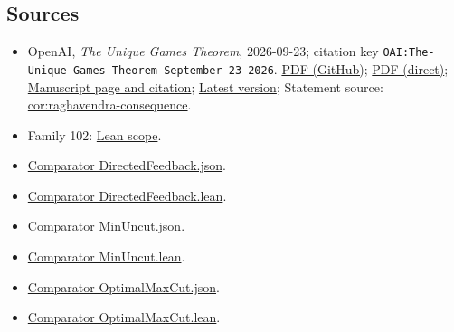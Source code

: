 \documentclass[11pt]{article}
\begin{document}
\subsection{Sources}
\begin{itemize}
\item OpenAI, \emph{The Unique Games Theorem}, 2026-09-23; citation key \texttt{OAI:The-Unique-Games-Theorem-September-23-2026}. \href{https://github.com/openai/math/blob/adc7f1241b42e322a6451854ab7e4b4c146bf78a/preprints/The-Unique-Games-Theorem-September-23-2026/paper.pdf}{PDF (GitHub)}; \href{https://github.com/openai/math/raw/adc7f1241b42e322a6451854ab7e4b4c146bf78a/preprints/The-Unique-Games-Theorem-September-23-2026/paper.pdf}{PDF (direct)}; \href{https://github.com/openai/math/blob/adc7f1241b42e322a6451854ab7e4b4c146bf78a/preprints/The-Unique-Games-Theorem-September-23-2026/README.md}{Manuscript page and citation}; \href{https://github.com/openai/math/blob/main/preprints/The-Unique-Games-Theorem-September-23-2026/paper.pdf}{Latest version}; Statement source: \href{https://github.com/openai/math/blob/adc7f1241b42e322a6451854ab7e4b4c146bf78a/preprints/The-Unique-Games-Theorem-September-23-2026/build/sections/07-consequences.tex\#L64}{cor:raghavendra-consequence}.
\item Family 102: \href{https://github.com/openai/math/blob/adc7f1241b42e322a6451854ab7e4b4c146bf78a/lean/docs/102.md}{Lean scope}.
\item \href{https://github.com/openai/math/blob/adc7f1241b42e322a6451854ab7e4b4c146bf78a/lean/ComparatorChallenges/DirectedFeedback.json}{Comparator DirectedFeedback.json}.
\item \href{https://github.com/openai/math/blob/adc7f1241b42e322a6451854ab7e4b4c146bf78a/lean/ComparatorChallenges/DirectedFeedback.lean}{Comparator DirectedFeedback.lean}.
\item \href{https://github.com/openai/math/blob/adc7f1241b42e322a6451854ab7e4b4c146bf78a/lean/ComparatorChallenges/MinUncut.json}{Comparator MinUncut.json}.
\item \href{https://github.com/openai/math/blob/adc7f1241b42e322a6451854ab7e4b4c146bf78a/lean/ComparatorChallenges/MinUncut.lean}{Comparator MinUncut.lean}.
\item \href{https://github.com/openai/math/blob/adc7f1241b42e322a6451854ab7e4b4c146bf78a/lean/ComparatorChallenges/OptimalMaxCut.json}{Comparator OptimalMaxCut.json}.
\item \href{https://github.com/openai/math/blob/adc7f1241b42e322a6451854ab7e4b4c146bf78a/lean/ComparatorChallenges/OptimalMaxCut.lean}{Comparator OptimalMaxCut.lean}.

\end{itemize}
\end{document}
